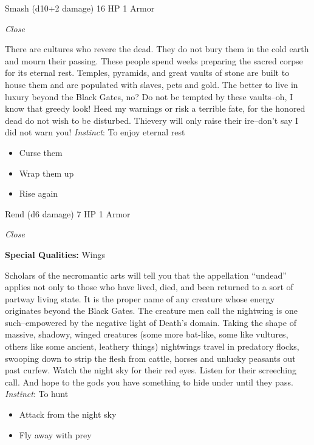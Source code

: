 \HRule
{}

Smash (d10+2 damage)\hspace*{\fill} 16 HP 1 Armor

\emph{Close}

\HRule
There are cultures who revere the dead. They do not bury them in the cold earth and mourn their passing. These people spend weeks preparing the sacred corpse for its eternal rest. Temples, pyramids, and great vaults of stone are built to house them and are populated with slaves, pets and gold. The better to live in luxury beyond the Black Gates, no? Do not be tempted by these vaults--oh, I know that greedy look! Heed my warnings or risk a terrible fate, for the honored dead do not wish to be disturbed. Thievery will only raise their ire--don't say I did not warn you! \emph{Instinct}: To enjoy eternal rest
\begin{itemize}
\item Curse them
\item Wrap them up
\item Rise again
\end{itemize}

\HRule
{}

Rend (d6 damage)\hspace*{\fill} 7 HP 1 Armor

\emph{Close}

\textbf{Special Qualities:}
Wings

\HRule
Scholars of the necromantic arts will tell you that the appellation ``undead'' applies not only to those who have lived, died, and been returned to a sort of partway living state. It is the proper name of any creature whose energy originates beyond the Black Gates. The creature men call the nightwing is one such--empowered by the negative light of Death's domain. Taking the shape of massive, shadowy, winged creatures (some more bat-like, some like vultures, others like some ancient, leathery things) nightwings travel in predatory flocks, swooping down to strip the flesh from cattle, horses and unlucky peasants out past curfew. Watch the night sky for their red eyes. Listen for their screeching call. And hope to the gods you have something to hide under until they pass. \emph{Instinct}: To hunt
\begin{itemize}
\item Attack from the night sky
\item Fly away with prey
\end{itemize}


